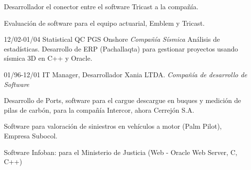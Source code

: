 \begin{entrylist}
{Desarrollador el conector entre el software Tricast a la compañía.

Evaluación de software para el equipo actuarial, Emblem y Tricast.}


  \entry
	{12/02-01/04}
	{Statistical QC}
	{PGS Onshore {\sl Compañía Sísmica}}
	{Análisis de estadísticas. Desarrollo de ERP (Pachallaqta) para gestionar proyectos
	usando sísmica 3D en C++ y Oracle.}

  \entry
	{01/96-12/01}
	{IT Manager, Desarrollador}
	{Xania LTDA. {\sl Compañía de desarrollo de Software}}
	{Desarrollo de Ports, software para el cargue descargue en buques y medición de pilas de carbón,
	para la compañía Intercor, ahora Cerrejón S.A.

Software para valoración de siniestros en vehículos a motor (Palm Pilot), Empresa
Subocol.

Software Infoban: para el Ministerio de Justicia (Web - Oracle Web Server, C,
C++)



}

  \end{entrylist}
